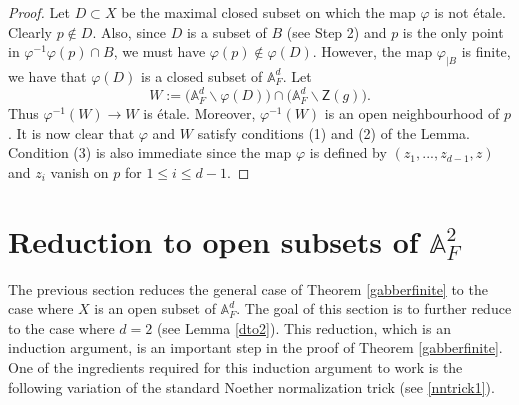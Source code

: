 \documentclass[10pt]{amsart}
\theoremstyle{plain}
\theoremstyle{definition}
\newcommand{\intersection}{\cap}
\newcommand{\A}{{\mathbb A}}
\let\syn\mathsf
\newcommand{\scr}{\scriptscriptstyle}
\begin{document}
\begin{proof}
\noindent Let $D\subset X$ be the maximal closed subset on which the map $\varphi$ is not \'{e}tale. Clearly $p\notin D$. Also, since $D$ is a subset of $B$ (see  Step 2) and $p$ is the only point in $\varphi^{-1}\varphi(p)\intersection B$, we must have $\varphi(p)\notin \varphi(D)$. However, the map $\varphi_{|B}$ is finite, we have that $\varphi(D)$ is a closed subset of  $\A^d_F$. Let 
$$ W:= \big( \A^d_F\backslash \varphi(D) \big) \intersection \big( \A^d_F\backslash \syn{Z}(g)\big). $$
Thus  $\varphi^{-1}(W)\to W$ is \'{e}tale. Moreover, $\varphi^{-1}(W)$ is an open neighbourhood of $p$. It is now clear that $\varphi$ and $W$ satisfy conditions (1) and (2) of the Lemma. Condition (3) is also immediate since the map $\varphi$ is defined by $(z_{\scr 1},...,z_{\scr d-1},z)$ and $z_{\scr i}$ vanish on $p$ for $1\leq i\leq d-1$.  
\end{proof}




\section{Reduction to open subsets of $\A^2_F$} \label{inductiond}

The previous section reduces the general case of Theorem \ref{gabberfinite} to the case where $X$ is an open subset of $\A^d_F$. The goal of this section is to further reduce to the case where $d=2$ (see Lemma \ref{dto2}). This reduction, which is an induction argument, is an important step in the proof of Theorem \ref{gabberfinite}. One of the ingredients required for this induction argument to work is the following  variation of the standard Noether normalization trick (see \eqref{nntrick1}).
\end{document}

